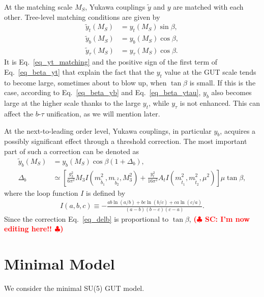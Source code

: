 \documentclass[12pt]{article}
\newcommand{\1}{\mbox{1}\hspace{-0.25em}\mbox{l}}
\def\TODO#1{ \textcolor{red}{\textbf{ ($\clubsuit$ #1 $\clubsuit$)} }}
\begin{document}
At the matching scale $M_S$, Yukawa couplings $\tilde{y}$ and $y$ are
matched with each other.  Tree-level matching conditions are given by
\begin{align}
 \tilde{y}_t (M_S) &= y_t (M_S) \sin \beta,\label{eq_yt_matching}\\
 \tilde{y}_b (M_S) &= y_b (M_S) \cos \beta, \\
 \tilde{y}_\tau (M_S) &= y_\tau (M_S) \cos \beta. 
\end{align}
It is Eq.~\eqref{eq_yt_matching} and the positive sign of the first term
of Eq.~\eqref{eq_beta_yt} that explain the fact that the $y_t$ value at
the GUT scale tends to become large, sometimes about to blow up, when
$\tan \beta$ is small.  If this is the case, according to
Eq.~\eqref{eq_beta_yb} and Eq.~\eqref{eq_beta_ytau}, $y_b$ also becomes
large at the higher scale thanks to the large $y_t$, while $y_\tau$
is not enhanced.  This can affect the $b$-$\tau$ unification, as we
will mention later.

At the next-to-leading order level, Yukawa couplings, in particular
$y_b$, acquires a possibly significant effect through a threshold
correction.  The most important part of such a correction can be denoted
as
\begin{align}
 \tilde{y}_b (M_S) &= y_b (M_S) \cos \beta (1 + \Delta_b),\\
 \Delta_b &\simeq \left[ \frac{g_3^2}{6\pi^2} M_3 I(m_{\tilde{b}_1}^2,
 m_{\tilde{b}_2^2}, M_3^2) + \frac{y_t^2}{16\pi^2} A_t
 I(m_{\tilde{t}_1}^2, m_{\tilde{t}_2}^2, \mu^2) \right] \mu \tan \beta,\label{eq_delb}
\end{align}
where the loop function $I$ is defined by
\begin{align}
 I(a, b, c) \equiv - \frac{ab \ln(a/b) + bc \ln(b/c) + ca
 \ln(c/a)}{(a-b) (b-c) (c-a)}.
\end{align}
Since the correction Eq.~\eqref{eq_delb} is proportional to $\tan
\beta$, \TODO{SC: I'm now editing here!!}

\section{Minimal Model}
\label{sec:Minimal}
We consider the minimal SU(5) GUT model.
\end{document}
